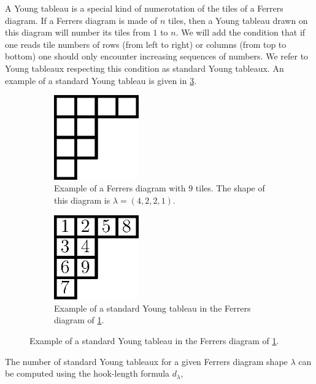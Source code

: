 A Young tableau is a special kind of numerotation of the tiles of a Ferrers
diagram. If a Ferrers diagram is made of $n$ tiles, then a Young tableau drawn
on this diagram will number its tiles from $1$ to $n$. We will add the
condition that if one reads tile numbers of rows (from left to right) or
columns (from top to bottom) one should only encounter increasing sequences of
numbers. We refer to Young tableaux respecting this condition as standard Young
tableaux. An example of a standard Young tableau is given in
\ref{fig:xy:lattice:young}.

\begin{figure}
\centering
\begin{subfigure}[b]{0.49\textwidth}
\centering
	\includegraphics[width=0.4\textwidth]{fig/x+y/lattice/ferrers}
	\caption{Example of a Ferrers diagram with $9$ tiles. The shape of this
diagram is \(\lambda = (4,2,2,1)\).}
	\label{fig:xy:lattice:ferrers}
\end{subfigure}
\begin{subfigure}[b]{0.49\textwidth}
\centering
	\includegraphics[width=0.4\textwidth]{fig/x+y/lattice/young}
	\caption{Example of a standard Young tableau in the Ferrers diagram of
\ref{fig:xy:lattice:ferrers}.}
	\label{fig:xy:lattice:young}
\end{subfigure}
\end{figure}

The number of standard Young tableaux for a given Ferrers diagram shape
\(\lambda\) can be computed using the hook-length formula \(d_{\lambda}\),

